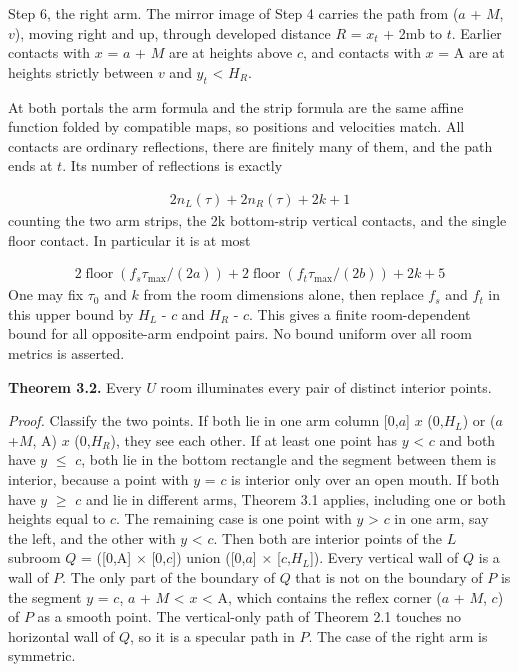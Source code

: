 \documentclass[11pt]{article}
\begin{document}
Step 6, the right arm. The mirror image of Step 4 carries the path from (\(a\) + \(M\), \(v\)), moving right and up, through developed distance \(R\) = \(x_{t}\) + 2mb to \(t\). Earlier contacts with \(x\) = \(a\) + \(M\) are at heights above \(c\), and contacts with \(x\) = A are at heights strictly between \(v\) and \(y_{t}\) < \(H_{R}\).

At both portals the arm formula and the strip formula are the same affine function folded by compatible maps, so positions and velocities match. All contacts are ordinary reflections, there are finitely many of them, and the path ends at \(t\). Its number of reflections is exactly

\begin{gather*}
2 n_{L}(\tau) + 2 n_{R}(\tau) + 2k + 1
\end{gather*}
counting the two arm strips, the 2k bottom-strip vertical contacts, and the single floor contact. In particular it is at most

\begin{gather*}
2 \operatorname{floor}(f_{s} \tau_{\mathrm{max}}/(2a)) + 2 \operatorname{floor}(f_{t} \tau_{\mathrm{max}}/(2b)) + 2k + 5
\end{gather*}
One may fix \(\tau_{0}\) and \(k\) from the room dimensions alone, then replace \(f_{s}\) and \(f_{t}\) in this upper bound by \(H_{L}\) - \(c\) and \(H_{R}\) - \(c\). This gives a finite room-dependent bound for all opposite-arm endpoint pairs. No bound uniform over all room metrics is asserted.

\textbf{Theorem 3.2.} Every \(U\) room illuminates every pair of distinct interior points.

\emph{Proof.} Classify the two points. If both lie in one arm column [0,\(a\)] \(x\) (0,\(H_{L}\)) or (\(a\)+\(M\), A) \(x\) (0,\(H_{R}\)), they see each other. If at least one point has \(y\) < \(c\) and both have \(y\) \(\le\) \(c\), both lie in the bottom rectangle and the segment between them is interior, because a point with \(y\) = \(c\) is interior only over an open mouth. If both have \(y\) \(\ge\) \(c\) and lie in different arms, Theorem 3.1 applies, including one or both heights equal to \(c\). The remaining case is one point with \(y\) > \(c\) in one arm, say the left, and the other with \(y\) < \(c\). Then both are interior points of the \(L\) subroom \(Q\) = ([0,A] \(\times\) [0,\(c\)]) union ([0,\(a\)] \(\times\) [\(c\),\(H_{L}\)]). Every vertical wall of \(Q\) is a wall of \(P\). The only part of the boundary of \(Q\) that is not on the boundary of \(P\) is the segment \(y\) = \(c\), \(a\) + \(M\) < \(x\) < A, which contains the reflex corner (\(a\) + \(M\), \(c\)) of \(P\) as a smooth point. The vertical-only path of Theorem 2.1 touches no horizontal wall of \(Q\), so it is a specular path in \(P\). The case of the right arm is symmetric.
\end{document}

